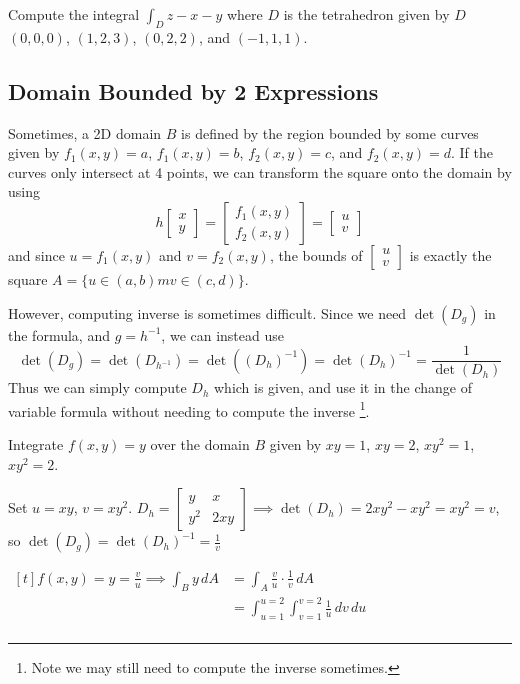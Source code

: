 \begin{exercise}
    Compute the integral $\int_D z - x - y$ where $D$ is the tetrahedron given by $D$ $(0,0,0)$, $(1,2,3)$, $(0,2,2)$, and $(-1,1,1)$.
\end{exercise}

\subsection*{Domain Bounded by 2 Expressions}

Sometimes, a 2D domain $B$ is defined by the region bounded by some curves given by $f_1(x,y) = a$, $f_1(x,y) = b$, $f_2(x,y) = c$, and $f_2(x,y) = d$. If the curves only intersect at 4 points, we can transform the square onto the domain by using $$h\begin{bmatrix} x \\ y \end{bmatrix} = \begin{bmatrix} f_1(x,y) \\ f_2(x,y) \end{bmatrix} = \begin{bmatrix} u \\ v \end{bmatrix}$$ and since $u = f_1(x,y)$ and $v = f_2(x,y)$, the bounds of $\begin{bmatrix} u \\ v \end{bmatrix}$ is exactly the square $A = \{ u \in (a, b)m v \in (c, d) \}$. 

However, computing inverse is sometimes difficult. Since we need $\det(D_g)$ in the formula, and $g = h^{-1}$, we can instead use $$\det(D_g) = \det(D_{h^{-1}}) = \det(\left(D_h\right)^{-1}) = \det(D_h)^{-1} = \frac{1}{\det(D_h)}$$ Thus we can simply compute $D_h$ which is given, and use it in the change of variable formula without needing to compute the inverse \footnote{ Note we may still need to compute the inverse sometimes. }. 

\begin{example}
    Integrate $f(x,y) = y$ over the domain $B$ given by $xy = 1$, $xy = 2$, $xy^2 = 1$, $xy^2 = 2$. 
    
    Set $u = xy$, $v = xy^2$. $D_h = \begin{bmatrix} y & x \\ y^2 & 2xy \end{bmatrix} \implies \det(D_h) = 2xy^2 - xy^2 = xy^2 = v$, so $\det(D_g) = \det(D_h)^{-1} = \frac{1}{v}$

    $\begin{aligned}[t]
        f(x, y) = y = \frac{v}{u} \implies \int_B y \,dA
         & = \int_A \frac{v}{u} \cdot \frac{1}{v} \,dA                \\
         & = \int_{u=1}^{u=2} \int_{v=1}^{v=2} \frac{1}{u}  \,dv \,du \\
    \end{aligned}$
\end{example}

